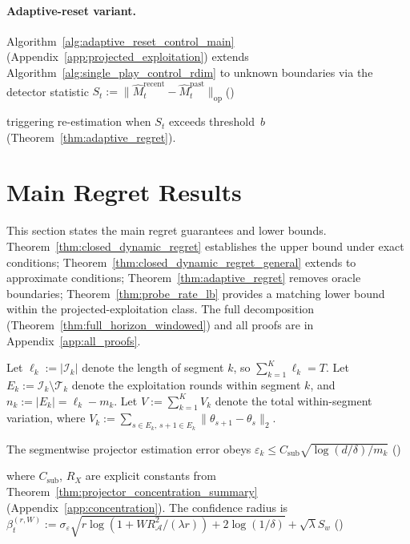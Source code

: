 \documentclass{article}
\newcommand{\op}{\mathrm{op}}
\newcommand{\cA}{\mathcal{A}}
\newcommand{\cT}{\mathcal{T}}
\newcommand{\cI}{\mathcal{I}}
\begin{document}
\paragraph{Adaptive-reset variant.}
Algorithm~\ref{alg:adaptive_reset_control_main}
(Appendix~\ref{app:projected_exploitation}) extends
Algorithm~\ref{alg:single_play_control_rdim} to unknown boundaries via
the detector statistic
$S_t := \|\widehat{M}_t^{\mathrm{recent}} - \widehat{M}_t^{\mathrm{past}}\|_{\op}$\hfill{}(\theequation)\label{eq:detector_stat}

\noindent triggering re-estimation when $S_t$ exceeds threshold~$b$
(Theorem~\ref{thm:adaptive_regret}).
\section{Main Regret Results}
\label{sec:theory}

  This section states the main regret guarantees and lower bounds.
  Theorem~\ref{thm:closed_dynamic_regret} establishes the upper bound under exact conditions;
  Theorem~\ref{thm:closed_dynamic_regret_general} extends to approximate conditions;
  Theorem~\ref{thm:adaptive_regret} removes oracle boundaries;
  Theorem~\ref{thm:probe_rate_lb} provides a matching lower bound within the projected-exploitation class.
  The full decomposition
  (Theorem~\ref{thm:full_horizon_windowed}) and all proofs are in
  Appendix~\ref{app:all_proofs}.


  Let $\ell_k := |\cI_k|$ denote the length of segment $k$, so $\sum_{k=1}^K \ell_k = T$.
  Let $E_k := \cI_k \setminus \cT_k$ denote the exploitation rounds within segment $k$, and $n_k := |E_k| = \ell_k - m_k$.
  Let $V := \sum_{k=1}^K V_k$ denote the total within-segment variation, where $V_k := \sum_{s\in E_k,\,s+1\in
  E_k}\|\theta_{s+1}-\theta_s\|_2$.

  The segmentwise projector estimation error obeys
  $\varepsilon_k \le C_{\mathrm{sub}} \sqrt{\log(d/\delta)/m_k}$
  \hfill{}(\theequation)\label{eq:eps_k_rate}

  \noindent where $C_{\mathrm{sub}}$, $R_X$ are explicit constants from Theorem~\ref{thm:projector_concentration_summary} (Appendix~\ref{app:concentration}).
  The confidence radius is $\beta_t^{(r,W)} := \sigma_\varepsilon\sqrt{r \log(1+WR_{\cA}^2/(\lambda r)) + 2\log(1/\delta)} + \sqrt{\lambda}S_w$
  \hfill{}(\theequation)\label{eq:beta_rW}
\end{document}
